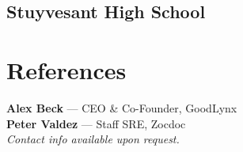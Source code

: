 \documentclass[]{plushcv}
\begin{document}
\begin{minipage}[t]{0.25\textwidth}
\sectionsep
\subsection{Stuyvesant High School}
\sectionsep

\section{References} 
\textbf{Alex Beck} — CEO \& Co-Founder, GoodLynx
\\
\textbf{Peter Valdez} — Staff SRE, Zocdoc
\\
\vspace{4pt}
{\color{date}\fontspec[Path = \pathlocationfont]{\locationfont}\fontsize{8pt}{10pt}\selectfont\itshape Contact info available upon request.\normalfont}

\end{minipage} 
\end{document}
